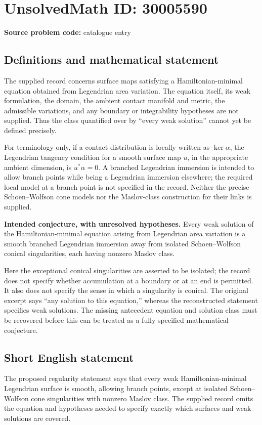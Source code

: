 \documentclass[11pt]{article}
\begin{document}
\section*{UnsolvedMath ID: 30005590}
\textbf{Source problem code:} catalogue entry
\subsection{Definitions and mathematical statement}
The supplied record concerns surface maps satisfying a Hamiltonian-minimal equation obtained from Legendrian area variation. The equation itself, its weak formulation, the domain, the ambient contact manifold and metric, the admissible variations, and any boundary or integrability hypotheses are not supplied. Thus the class quantified over by ``every weak solution'' cannot yet be defined precisely.

For terminology only, if a contact distribution is locally written as \(\ker\alpha\), the Legendrian tangency condition for a smooth surface map \(u\), in the appropriate ambient dimension, is \(u^*\alpha=0\). A branched Legendrian immersion is intended to allow branch points while being a Legendrian immersion elsewhere; the required local model at a branch point is not specified in the record. Neither the precise Schoen--Wolfson cone models nor the Maslov-class construction for their links is supplied.

\textbf{Intended conjecture, with unresolved hypotheses.} Every weak solution of the Hamiltonian-minimal equation arising from Legendrian area variation is a smooth branched Legendrian immersion away from isolated Schoen--Wolfson conical singularities, each having nonzero Maslov class.

Here the exceptional conical singularities are asserted to be isolated; the record does not specify whether accumulation at a boundary or at an end is permitted. It also does not specify the sense in which a singularity is conical. The original excerpt says ``any solution to this equation,'' whereas the reconstructed statement specifies weak solutions. The missing antecedent equation and solution class must be recovered before this can be treated as a fully specified mathematical conjecture.
\subsection{Short English statement}
The proposed regularity statement says that every weak Hamiltonian-minimal Legendrian surface is smooth, allowing branch points, except at isolated Schoen--Wolfson cone singularities with nonzero Maslov class. The supplied record omits the equation and hypotheses needed to specify exactly which surfaces and weak solutions are covered.
\end{document}
